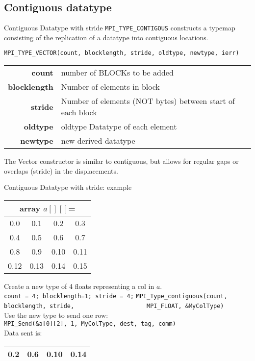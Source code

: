 \documentclass[aspectratio=43]{beamer}
\begin{document}
\subsection{Contiguous datatype}
\begin{frame}[fragile]{Contiguous Datatype with stride}
\verb+MPI_TYPE_CONTIGOUS+ constructs a typemap consisting of the replication of a datatype into contiguous locations.
\footnotesize
\begin{verbatim}
MPI_TYPE_VECTOR(count, blocklength, stride, oldtype, newtype, ierr)
\end{verbatim}
\vspace{-0.2cm}
\begin{black1block}{}
\begin{tabular}{rp{8cm}}
\textbf{count} & number of BLOCKs to be added\\
\textbf{blocklength} & Number of elements in block\\
\textbf{stride} & Number of elements (NOT bytes) between start of each block\\
\textbf{oldtype} & oldtype Datatype of each element\\
\textbf{newtype} & new derived datatype\\
\end{tabular}
\end{black1block}
The Vector constructor is similar to contiguous, but allows for regular gaps or overlaps (stride) in the displacements.
\end{frame}

\begin{frame}[fragile]{Contiguous Datatype with stride: example}
\begin{center}
\begin{tabular}{|c|c|c|c|}
    \multicolumn{4}{c}{array $a[][]$=}\\\hline
0.0  & 0.1  & 0.2  & 0.3\\\hline
0.4  & 0.5  & 0.6  & 0.7\\\hline
0.8  & 0.9  & 0.10 & 0.11\\\hline
0.12 & 0.13 & 0.14 & 0.15\\\hline
\end{tabular}
\end{center}
Create a new type of 4 floats representing a col in $a$.\\
\verb+count = 4; blocklength=1; stride = 4;+
\verb+MPI_Type_contiguous(count, blocklength, stride,+
\verb+                    MPI_FLOAT, &MyColType)+\\[0.5cm]
Use the new type to send one row:\\
\verb+MPI_Send(&a[0][2], 1, MyColType, dest, tag, comm)+\\[0.5cm]
Data sent is:
\begin{tabular}{|c|c|c|c|}
\hline
\color{cscsblue}0.2  & \color{cscsblue}0.6  & \color{cscsblue}0.10 & \color{cscsblue}0.14\\
\hline
\end{tabular}

\end{frame}
\end{document}
